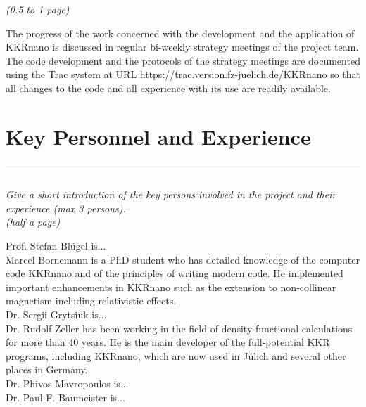 \documentclass [a4paper, 12pt]{article}
\begin{document}
\textit{(0.5 to 1 page)}




The progress of the work concerned with the development and the application of KKRnano
is discussed in regular bi-weekly strategy meetings of the project team.
The code development and the protocols of the strategy meetings are documented
using the Trac system at URL https://trac.version.fz-juelich.de/KKRnano so
that all changes to the code and all experience with its use are readily available.


\bigskip

\section{Key Personnel and Experience}
\rule{\textwidth}{0.4pt}\\
\textit{Give a short introduction of the key persons involved in the project and their experience (max 3 persons).}\\

\textit{(half a page)}

Prof. Stefan Bl{\"u}gel is...
\\
Marcel Bornemann is a PhD student who has
detailed knowledge of the computer code KKRnano and of the principles of writing modern code. 
He implemented important enhancements in KKRnano such as the extension to non-collinear
magnetism including relativistic effects.
\\
Dr. Sergii Grytsiuk is...
\\
Dr. Rudolf Zeller has been working in the field of density-functional calculations for more than 40 years. 
He is the main developer of the full-potential KKR programs, including KKRnano, 
which are now used in J{\"u}lich and several other places in Germany. 
\\
Dr. Phivos Mavropoulos is...
\\
Dr. Paul F. Baumeister is...
\end{document}
